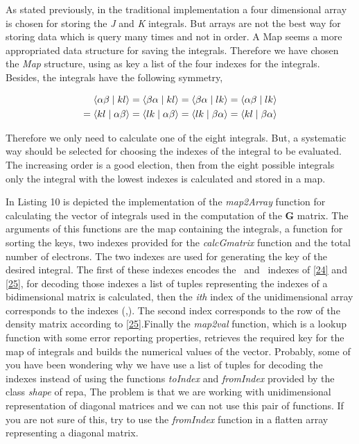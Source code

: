 \documentclass{tmr}
\begin{document}
As stated previously, in the traditional implementation a four dimensional array
is chosen for storing the \textit{J} and \textit{K} integrals. But arrays are not
the best way for storing data which is query many times and not in order. A Map 
seems a more appropriated data structure for saving the integrals. Therefore 
we have chosen the \textit{Map} structure, using as key a list of the four
indexes for the integrals. Besides, the integrals have the following
symmetry, 

\begin{equation} \label{27}
\begin{split}
\braket{\alpha \beta \mid kl} = \braket{ \beta \alpha \mid kl} 
= \braket{\beta \alpha \mid lk} = \braket{\alpha \beta \mid lk} \\
= \braket{kl\mid \alpha \beta} = \braket{lk \mid \alpha \beta} 
=\braket{lk \mid \beta \alpha} = \braket{kl\mid \beta \alpha}
\end{split}
\end{equation}

Therefore we only need to calculate one of the eight integrals. But, a systematic
way should be selected for choosing the indexes of the integral to be
evaluated. The increasing order is a good election, then from the eight possible integrals
only the integral with the lowest indexes is calculated and stored in a map. 

In Listing 10 is depicted the implementation of the \textit{map2Array} function for
calculating the vector of integrals used in the computation of the \textbf{G} matrix. The
arguments of this functions are the map containing the integrals, a function 
for sorting the keys, two indexes provided for the \textit{calcGmatrix} function
and the total number of electrons. The two indexes are used for generating
the key of the desired integral. The first of these indexes encodes the \textalpha\ and 
\textbeta\ indexes of \eqref{24} and \eqref{25}, for decoding those indexes a list
of tuples representing the indexes of a bidimensional matrix is calculated,
then the \textit{ith} index of the unidimensional array corresponds to the indexes (\textalpha,\textbeta).
The second index corresponds to the row of the density matrix according to \eqref{25}.Finally
the \textit{map2val} function, which is a lookup function with some error reporting properties, 
retrieves the required key for the map of integrals and builds the numerical values of the vector.
Probably, some of you have been wondering why we have use a list of tuples for decoding 
the indexes instead of using the functions \textit{toIndex} and \textit{fromIndex}
provided by the class \textit{shape} of repa, The problem is that we are working with
unidimensional representation of diagonal matrices and we can not use this pair of functions.
If you are not sure of this, try to use the \textit{fromIndex} function in a flatten array representing
a diagonal matrix.
\end{document}

